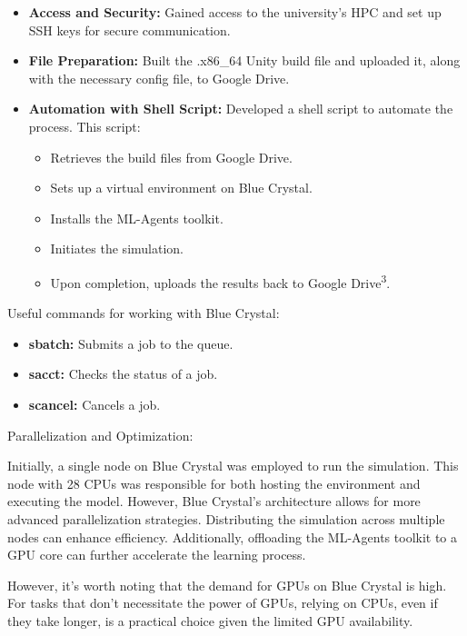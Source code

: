 \begin{itemize}
    \item \textbf{Access and Security:} Gained access to the university's HPC and set up SSH keys for secure communication.
    \item \textbf{File Preparation:} Built the .x86\_64 Unity build file and uploaded it, along with the necessary config file, to Google Drive.
    \item \textbf{Automation with Shell Script:} Developed a shell script to automate the process. This script:
    \begin{itemize}
        \item Retrieves the build files from Google Drive.
        \item Sets up a virtual environment on Blue Crystal.
        \item Installs the ML-Agents toolkit.
        \item Initiates the simulation.
        \item Upon completion, uploads the results back to Google Drive\textsuperscript{3}.
    \end{itemize}
\end{itemize}

Useful commands for working with Blue Crystal:

\begin{itemize}
    \item \textbf{sbatch:} Submits a job to the queue.
    \item \textbf{sacct:} Checks the status of a job.
    \item \textbf{scancel:} Cancels a job.
\end{itemize}

Parallelization and Optimization:

Initially, a single node on Blue Crystal was employed to run the simulation. This node with 28 CPUs was responsible for both hosting the environment and executing the model. However, Blue Crystal's architecture allows for more advanced parallelization strategies. Distributing the simulation across multiple nodes can enhance efficiency. Additionally, offloading the ML-Agents toolkit to a GPU core can further accelerate the learning process.

However, it's worth noting that the demand for GPUs on Blue Crystal is high. For tasks that don't necessitate the power of GPUs, relying on CPUs, even if they take longer, is a practical choice given the limited GPU availability.

\label{sec:sec01}





